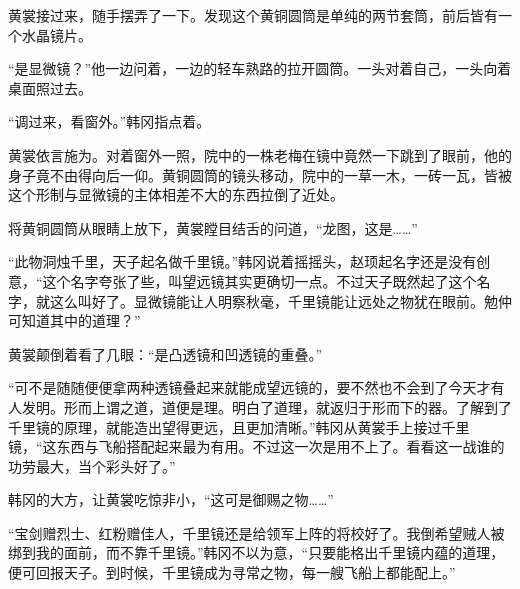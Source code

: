 黄裳接过来，随手摆弄了一下。发现这个黄铜圆筒是单纯的两节套筒，前后皆有一个水晶镜片。

“是显微镜？”他一边问着，一边的轻车熟路的拉开圆筒。一头对着自己，一头向着桌面照过去。

“调过来，看窗外。”韩冈指点着。

黄裳依言施为。对着窗外一照，院中的一株老梅在镜中竟然一下跳到了眼前，他的身子竟不由得向后一仰。黄铜圆筒的镜头移动，院中的一草一木，一砖一瓦，皆被这个形制与显微镜的主体相差不大的东西拉倒了近处。

将黄铜圆筒从眼睛上放下，黄裳瞠目结舌的问道，“龙图，这是……”

“此物洞烛千里，天子起名做千里镜。”韩冈说着摇摇头，赵顼起名字还是没有创意，“这个名字夸张了些，叫望远镜其实更确切一点。不过天子既然起了这个名字，就这么叫好了。显微镜能让人明察秋毫，千里镜能让远处之物犹在眼前。勉仲可知道其中的道理？”

黄裳颠倒着看了几眼：“是凸透镜和凹透镜的重叠。”

“可不是随随便便拿两种透镜叠起来就能成望远镜的，要不然也不会到了今天才有人发明。形而上谓之道，道便是理。明白了道理，就返归于形而下的器。了解到了千里镜的原理，就能造出望得更远，且更加清晰。”韩冈从黄裳手上接过千里镜，“这东西与飞船搭配起来最为有用。不过这一次是用不上了。看看这一战谁的功劳最大，当个彩头好了。”

韩冈的大方，让黄裳吃惊非小，“这可是御赐之物……”

“宝剑赠烈士、红粉赠佳人，千里镜还是给领军上阵的将校好了。我倒希望贼人被绑到我的面前，而不靠千里镜。”韩冈不以为意，“只要能格出千里镜内蕴的道理，便可回报天子。到时候，千里镜成为寻常之物，每一艘飞船上都能配上。”

